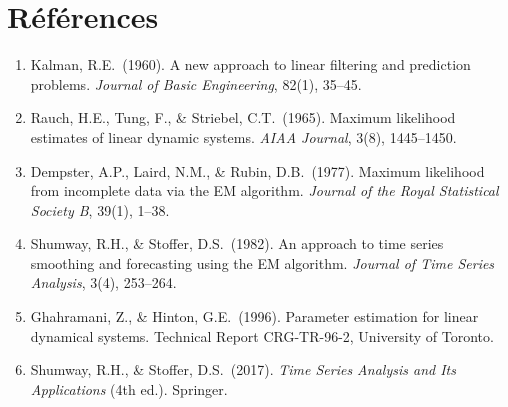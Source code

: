 \documentclass[11pt,a4paper]{article}
\begin{document}
\section*{Références}

\begin{enumerate}
\item Kalman, R.E.\ (1960). A new approach to linear filtering and prediction problems.
      \textit{Journal of Basic Engineering}, 82(1), 35--45.

\item Rauch, H.E., Tung, F., \& Striebel, C.T.\ (1965). Maximum likelihood estimates of
      linear dynamic systems. \textit{AIAA Journal}, 3(8), 1445--1450.

\item Dempster, A.P., Laird, N.M., \& Rubin, D.B.\ (1977). Maximum likelihood from
      incomplete data via the EM algorithm. \textit{Journal of the Royal Statistical
      Society B}, 39(1), 1--38.

\item Shumway, R.H., \& Stoffer, D.S.\ (1982). An approach to time series smoothing and
      forecasting using the EM algorithm. \textit{Journal of Time Series Analysis},
      3(4), 253--264.

\item Ghahramani, Z., \& Hinton, G.E.\ (1996). Parameter estimation for linear dynamical
      systems. Technical Report CRG-TR-96-2, University of Toronto.

\item Shumway, R.H., \& Stoffer, D.S.\ (2017).
      \textit{Time Series Analysis and Its Applications} (4th ed.). Springer.
\end{enumerate}
\end{document}
